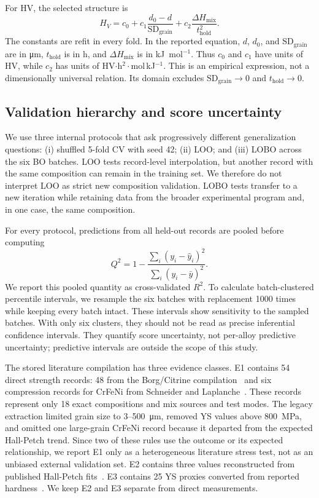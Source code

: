 \documentclass[5p,times,twocolumn]{elsarticle}
\begin{document}
For HV, the selected structure is
\begin{equation}
H_V=c_0+c_1\frac{d_0-d}{\mathrm{SD}_{\mathrm{grain}}}
       +c_2\frac{\Delta H_{\mathrm{mix}}}{t_{\mathrm{hold}}^2}.
\label{eq:hvform}
\end{equation}
The constants are refit in every fold. In the reported equation, $d$, $d_0$, and $\mathrm{SD}_{\mathrm{grain}}$ are in \si{\micro\meter}, $t_{\mathrm{hold}}$ is in h, and $\Delta H_{\mathrm{mix}}$ is in kJ~mol$^{-1}$. Thus $c_0$ and $c_1$ have units of HV, while $c_2$ has units of HV$\cdot$h$^2\cdot$mol\,kJ$^{-1}$. This is an empirical expression, not a dimensionally universal relation. Its domain excludes $\mathrm{SD}_{\mathrm{grain}}\rightarrow0$ and $t_{\mathrm{hold}}\rightarrow0$.

\subsection{Validation hierarchy and score uncertainty}
\label{sec:validation}

We use three internal protocols that ask progressively different generalization questions: (i) shuffled 5-fold CV with seed 42; (ii) LOO; and (iii) LOBO across the six BO batches. LOO tests record-level interpolation, but another record with the same composition can remain in the training set. We therefore do not interpret LOO as strict new composition validation. LOBO tests transfer to a new iteration while retaining data from the broader experimental program and, in one case, the same composition.

For every protocol, predictions from all held-out records are pooled before computing
\begin{equation}
Q^2=1-\frac{\sum_i(y_i-\hat y_i)^2}{\sum_i(y_i-\bar y)^2}.
\end{equation}
We report this pooled quantity as cross-validated $R^2$. To calculate batch-clustered percentile intervals, we resample the six batches with replacement 1000 times while keeping every batch intact. These intervals show sensitivity to the sampled batches. With only six clusters, they should not be read as precise inferential confidence intervals. They quantify score uncertainty, not per-alloy predictive uncertainty; predictive intervals are outside the scope of this study.

The stored literature compilation has three evidence classes. E1 contains 54 direct strength records: 48 from the Borg/Citrine compilation~\cite{Borg2020} and six compression records for CrFeNi from Schneider and Laplanche~\cite{SchneiderCrFeNi2021}. These records represent only 18 exact compositions and mix sources and test modes. The legacy extraction limited grain size to 3--\SI{500}{\micro\meter}, removed YS values above \SI{800}{MPa}, and omitted one large-grain CrFeNi record because it departed from the expected Hall-Petch trend. Since two of these rules use the outcome or its expected relationship, we report E1 only as a heterogeneous literature stress test, not as an unbiased external validation set. E2 contains three values reconstructed from published Hall-Petch fits~\cite{Otto2013}. E3 contains 25 YS proxies converted from reported hardness~\cite{HuangTY2019}. We keep E2 and E3 separate from direct measurements.
\end{document}
